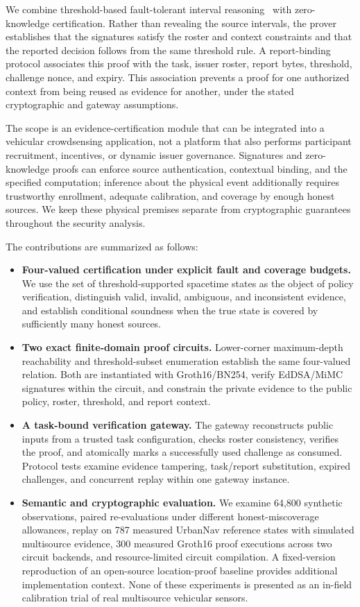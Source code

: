 We combine threshold-based fault-tolerant interval reasoning~\cite{Marzullo1990,BFTPoLoc,PG,CRSF} with zero-knowledge certification. Rather than revealing the source intervals, the prover establishes that the signatures satisfy the roster and context constraints and that the reported decision follows from the same threshold rule. A report-binding protocol associates this proof with the task, issuer roster, report bytes, threshold, challenge nonce, and expiry. This association prevents a proof for one authorized context from being reused as evidence for another, under the stated cryptographic and gateway assumptions.

The scope is an evidence-certification module that can be integrated into a vehicular crowdsensing application, not a platform that also performs participant recruitment, incentives, or dynamic issuer governance. Signatures and zero-knowledge proofs can enforce source authentication, contextual binding, and the specified computation; inference about the physical event additionally requires trustworthy enrollment, adequate calibration, and coverage by enough honest sources. We keep these physical premises separate from cryptographic guarantees throughout the security analysis.

The contributions are summarized as follows:
\begin{itemize}
\item \textbf{Four-valued certification under explicit fault and coverage budgets.} We use the set of threshold-supported spacetime states as the object of policy verification, distinguish valid, invalid, ambiguous, and inconsistent evidence, and establish conditional soundness when the true state is covered by sufficiently many honest sources.
\item \textbf{Two exact finite-domain proof circuits.} Lower-corner maximum-depth reachability and threshold-subset enumeration establish the same four-valued relation. Both are instantiated with Groth16/BN254, verify EdDSA/MiMC signatures within the circuit, and constrain the private evidence to the public policy, roster, threshold, and report context.
\item \textbf{A task-bound verification gateway.} The gateway reconstructs public inputs from a trusted task configuration, checks roster consistency, verifies the proof, and atomically marks a successfully used challenge as consumed. Protocol tests examine evidence tampering, task/report substitution, expired challenges, and concurrent replay within one gateway instance.
\item \textbf{Semantic and cryptographic evaluation.} We examine 64,800 synthetic observations, paired re-evaluations under different honest-miscoverage allowances, replay on 787 measured UrbanNav reference states with simulated multisource evidence, 300 measured Groth16 proof executions across two circuit backends, and resource-limited circuit compilation. A fixed-version reproduction of an open-source location-proof baseline provides additional implementation context. None of these experiments is presented as an in-field calibration trial of real multisource vehicular sensors.
\end{itemize}

